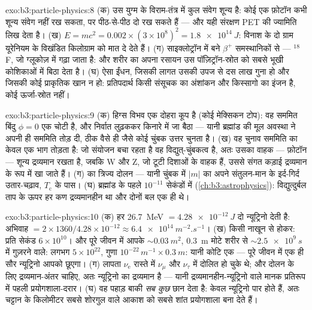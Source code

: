 \begin{solution}{exo:b3:particle-physics:8}
(क) उस युग्म के विराम-तंत्र में कुल संवेग शून्य है: कोई एक
फ़ोटॉन कभी शून्य संवेग नहीं रख सकता, पर पीठ-से-पीठ दो रख सकते हैं ---
और यही संरक्षण PET की ज्यामिति लिख देता है। (ख) $E = mc^2 =
0.002\times(3\times10^8)^2 = \qty{1.8e14}{J}$: विनाश के दो ग्राम
यूरेनियम के विखंडित किलोग्राम को मात दे देते हैं। (ग)
साइक्लोट्रॉन में बने $\beta^+$ समस्थानिकों से --- $^{18}$F, जो
ग्लूकोज़ में गढ़ा जाता है: और शरीर का अपना रसायन उस पॉज़िट्रॉन-स्रोत
को सबसे भूखी कोशिकाओं में बिठा देता है। (घ) ऐसा ईंधन, जिसकी लागत
उसकी उपज से दस लाख गुना हो और जिसकी कोई प्राकृतिक खान न हो:
प्रतिपदार्थ किसी संसूचक का अंशांकन और किस्सागो का इंजन है, कोई
ऊर्जा-स्रोत नहीं।
\end{solution}

\begin{solution}{exo:b3:particle-physics:9}
(क) हिग्स विभव एक दोहरा कूप है (कोई मेक्सिकन टोप): वह
सममित बिंदु $\phi = 0$ एक चोटी है, और निर्वात लुढ़ककर
किनारे में जा बैठा --- यानी ब्रह्मांड की मूल अवस्था ने अपनी ही
सममिति तोड़ दी, ठीक वैसे ही जैसे कोई चुंबक उत्तर चुनता है। (ख) वह चुनाव
सममिति का केवल एक भाग तोड़ता है: जो संयोजन बचा रहता है
वह विद्युत्-चुंबकत्व है, अतः उसका वाहक --- फ़ोटॉन ---
शून्य द्रव्यमान रखता है, जबकि W और Z, जो टूटी दिशाओं के वाहक हैं,
उससे संगत कड़ाई द्रव्यमान के रूप में खा जाते हैं। (ग)  का
त्रिज्य दोलन --- यानी चुंबक में
$|m|$ का अपने संतुलन-मान के इर्द-गिर्द उतार-चढ़ाव,
$T_{\text{c}}$ के पास। (घ) ब्रह्मांड के पहले $10^{-11}$ सेकंडों में
(\cref{ch:b3:astrophysics}): विद्युत्दुर्बल ताप के ऊपर हर कण
द्रव्यमानहीन था और दोनों बल एक ही थे।
\end{solution}

\begin{solution}{exo:b3:particle-physics:10}
(क) हर \qty{26.7}{MeV} $= \qty{4.28e-12}{J}$ दो
न्यूट्रिनो देती है: अभिवाह $= 2\times1360/4.28\times10^{-12} \approx
\qty{6.4e14}{m^{-2}.s^{-1}}$। (ख) किसी नाखून से होकर:
प्रति सेकंड $6\times10^{10}$। और पूरे जीवन में आपके
${\sim}\qty{0.03}{m^2}$, \qty{0.3}{m} मोटे शरीर से
${\sim}\qty{2.5e9}{s}$ में गुज़रने वाले: लगभग $5\times10^{22}$, गुणा
$10^{-22}\,\unit{m^{-1}}\times\qty{0.3}{m}$: यानी कोटि एक ---
पूरे जीवन में एक ही सौर न्यूट्रिनो आपको छूएगा। (ग)
लापता $\nu_{\text{e}}$ रास्ते में $\nu_\mu$ और
$\nu_\tau$ में दोलित हो चुके थे; और दोलन के लिए द्रव्यमान-अंतर चाहिए,
अतः न्यूट्रिनो का द्रव्यमान है --- यानी द्रव्यमानहीन-न्यूट्रिनो वाले
मानक प्रतिरूप में पहली प्रयोगशाला-दरार। (घ) वह पहाड़ बाकी
\emph{सब कुछ} छान देता है: केवल न्यूट्रिनो पार होते हैं, अतः चट्टान के
किलोमीटर सबसे शोरगुल वाले आकाश को सबसे शांत प्रयोगशाला बना देते हैं।
\end{solution}

